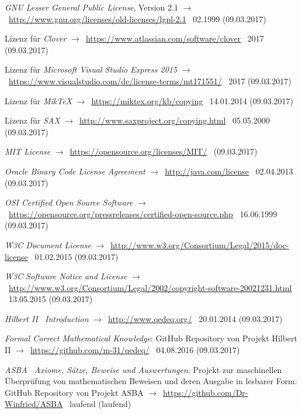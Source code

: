 \documentclass[english,ngerman,parskip=half,headsepline,footsepline]{scrreprt}
\begin{document}
\begin{flushleft}
\begin{thebibliography}{12}
			\emph{GNU Lesser General Public License}, Version 2.1 $\rightarrow$~\url{http://www.gnu.org/licenses/old-licenses/lgpl-2.1} \textendash\ 02.1999 (09.03.2017)

			Lizenz für \emph{Clover} $\rightarrow$~\url{https://www.atlassian.com/software/clover} \textendash\ 2017 (09.03.2017)

			Lizenz für \emph{Microsoft Visual Studio Express 2015} $\rightarrow$~\url{https://www.visualstudio.com/de/license-terms/mt171551/} \textendash\ 2017 (09.03.2017)

			Lizenz für \emph{MikTeX} $\rightarrow$~\url{https://miktex.org/kb/copying} \textendash\ 14.01.2014 (09.03.2017)

			Lizenz für \emph{SAX} $\rightarrow$~\url{http://www.saxproject.org/copying.html} \textendash\ 05.05.2000 (09.03.2017)

			\emph{MIT License} $\rightarrow$~\url{https://opensource.org/licenses/MIT/} \textendash\ (09.03.2017)

			\emph{Oracle Binary Code License Agreement} $\rightarrow$~\url{http://java.com/license} \textendash\ 02.04.2013 (09.03.2017)

			\emph{OSI Certified Open Source Software} $\rightarrow$~\url{https://opensource.org/pressreleases/certified-open-source.php} \textendash\ 16.06.1999 (09.03.2017)

			\emph{W3C Document License} $\rightarrow$~\url{http://www.w3.org/Consortium/Legal/2015/doc-license} \textendash\ 01.02.2015 (09.03.2017)

			\emph{W3C Software Notice and License} $\rightarrow$~\url{http://www.w3.org/Consortium/Legal/2002/copyright-software-20021231.html} \textendash\ 13.05.2015 (09.03.2017)

			\emph{Hilbert II \textendash\ Introduction} $\rightarrow$~\url{http://www.qedeq.org/} \textendash\ 20.01.2014 (09.03.2017)

			\emph{Formal Correct Mathematical Knowledge}: GitHub Repository von Projekt Hilbert II $\rightarrow$~\url{https://github.com/m-31/qedeq/} \textendash\ 04.08.2016 (09.03.2017)

			\emph{ASBA \textendash\ Axiome, Sätze, Beweise und Auswertungen}. Projekt zur maschinellen Überprüfung von mathematischen Beweisen und deren Ausgabe in lesbarer Form: GitHub Repository von Projekt ASBA $\rightarrow$~\url{https://github.com/Dr-Winfried/ASBA} \textendash\ laufend (laufend)


\end{thebibliography}
\end{flushleft}
\end{document}
